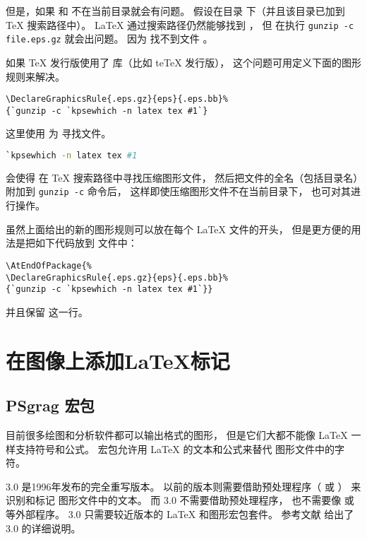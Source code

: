 但是，如果  和  不在当前目录就会有问题。
假设在目录  下（并且该目录已加到 \TeX{} 搜索路径中）。
\LaTeX{} 通过搜索路径仍然能够找到 ，
但  在执行 \verb|gunzip -c file.eps.gz| 就会出问题。
因为  找不到文件 。

如果 \TeX{} 发行版使用了  库（比如 te\TeX{} 发行版），
这个问题可用定义下面的图形规则来解决。
\begin{lstlisting}
\DeclareGraphicsRule{.eps.gz}{eps}{.eps.bb}%
{`gunzip -c `kpsewhich -n latex tex #1`}
\end{lstlisting}
这里使用  为  寻找文件。
\begin{lstlisting}[language=bash]
`kpsewhich -n latex tex #1
\end{lstlisting}
会使得  在 \TeX{} 搜索路径中寻找压缩图形文件，
然后把文件的全名（包括目录名）附加到 \texttt{gunzip -c} 命令后，
这样即使压缩图形文件不在当前目录下， 也可对其进行操作。

虽然上面给出的新的图形规则可以放在每个 \LaTeX{} 文件的开头，
但是更方便的用法是把如下代码放到  文件中：
\begin{lstlisting}
\AtEndOfPackage{%
\DeclareGraphicsRule{.eps.gz}{eps}{.eps.bb}%
{`gunzip -c `kpsewhich -n latex tex #1`}}
\end{lstlisting}
并且保留  这一行。


\section{在图像上添加\LaTeX{}标记}\label{sec:graphics-text}

\subsection{PSgrag 宏包}\label{ssec:psfrag}

目前很多绘图和分析软件都可以输出格式的图形，
但是它们大都不能像 \LaTeX{} 一样支持符号和公式。
 宏包允许用 \LaTeX{} 的文本和公式来替代  图形文件中的字符。

 3.0 是1996年发布的完全重写版本。
以前的版本则需要借助预处理程序（ 或 ）
来识别和标记  图形文件中的文本。
而 3.0 不需要借助预处理程序，
也不需要像  或  等外部程序。
 3.0 只需要较近版本的 \LaTeX{} 和图形宏包套件。
参考文献 \cite{psfrag-doc} 给出了 3.0 的详细说明。

